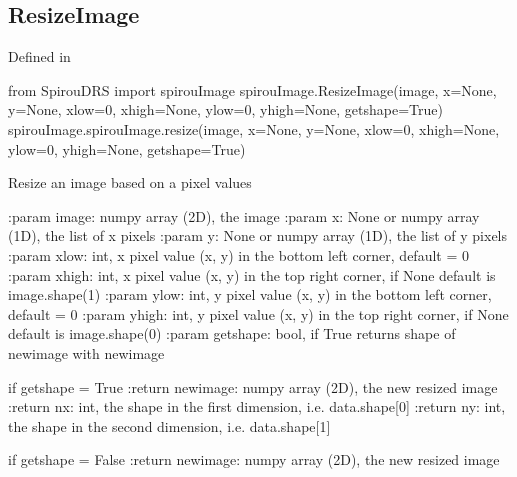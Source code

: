 \noindent\begin{minipage}{\textwidth}
\subsection{ResizeImage}

Defined in \spirouImage{}

\begin{pythonbox}
from SpirouDRS import spirouImage
spirouImage.ResizeImage(image, x=None, y=None, xlow=0, xhigh=None, ylow=0, yhigh=None, getshape=True)
spirouImage.spirouImage.resize(image, x=None, y=None, xlow=0, xhigh=None, ylow=0, yhigh=None, getshape=True)
\end{pythonbox}

\begin{pythondocstring}
Resize an image based on a pixel values

:param image: numpy array (2D), the image
:param x: None or numpy array (1D), the list of x pixels
:param y: None or numpy array (1D), the list of y pixels
:param xlow: int, x pixel value (x, y) in the bottom left corner,
             default = 0
:param xhigh:  int, x pixel value (x, y) in the top right corner,
             if None default is image.shape(1)
:param ylow: int, y pixel value (x, y) in the bottom left corner,
             default = 0
:param yhigh: int, y pixel value (x, y) in the top right corner,
             if None default is image.shape(0)
:param getshape: bool, if True returns shape of newimage with newimage

if getshape = True
:return newimage: numpy array (2D), the new resized image
:return nx: int, the shape in the first dimension, i.e. data.shape[0]
:return ny: int, the shape in the second dimension, i.e. data.shape[1]

if getshape = False
:return newimage: numpy array (2D), the new resized image
\end{pythondocstring}
\end{minipage}


